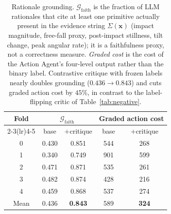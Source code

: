 \begin{table}[!t]
\centering
\caption{Rationale grounding. $\mathcal{G}_{\mathrm{faith}}$ is the fraction of LLM rationales that cite at least one primitive actually present in the evidence string $\Sigma(\mathbf{x})$ (impact magnitude, free-fall proxy, post-impact stillness, tilt change, peak angular rate); it is a faithfulness proxy, not a correctness measure. \emph{Graded cost} is the cost of the Action Agent's four-level output rather than the binary label. Contrastive critique with frozen labels nearly doubles grounding ($0.436{\rightarrow}0.843$) and cuts graded action cost by $45\%$, in contrast to the label-flipping critic of Table~\ref{tab:negative}.}
\label{tab:grounding}
\begin{tabular}{ccccc}
\toprule
\multirow{2}{*}{Fold} & \multicolumn{2}{c}{$\mathcal{G}_{\mathrm{faith}}$} & \multicolumn{2}{c}{Graded action cost} \\
\cmidrule(lr){2-3}\cmidrule(lr){4-5}
 & base & $+$critique & base & $+$critique \\
\midrule
0 & 0.430 & 0.851 & 544 & 268 \\
1 & 0.340 & 0.749 & 901 & 599 \\
2 & 0.471 & 0.871 & 535 & 261 \\
3 & 0.482 & 0.874 & 428 & 216 \\
4 & 0.459 & 0.868 & 537 & 274 \\
\midrule
Mean & 0.436 & \textbf{0.843} & 589 & \textbf{324} \\
\bottomrule
\end{tabular}
\end{table}
